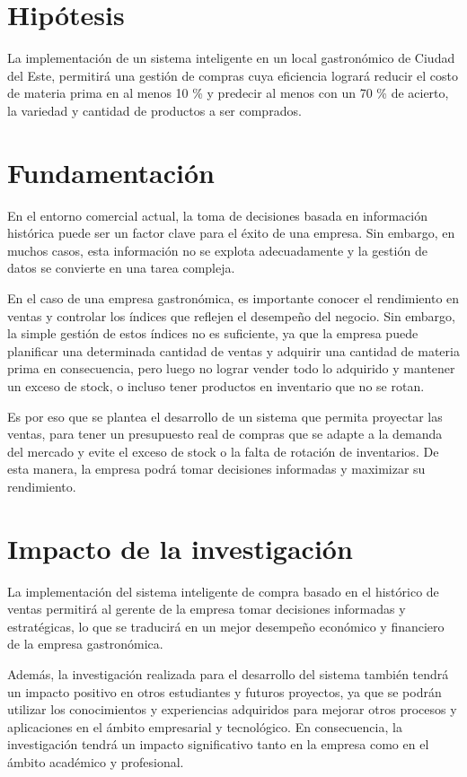 \section{Hipótesis}

La implementación de un sistema inteligente en un local gastronómico de Ciudad del Este, permitirá una gestión de compras cuya eficiencia logrará reducir el costo de materia prima en al menos 10 \% y predecir al menos con un 70 \% de acierto, la variedad y cantidad de productos a ser comprados.

\section{Fundamentación}

En el entorno comercial actual, la toma de decisiones basada en información histórica puede ser un factor clave para el éxito de una empresa. Sin embargo, en muchos casos, esta información no se explota adecuadamente y la gestión de datos se convierte en una tarea compleja.

En el caso de una empresa gastronómica, es importante conocer el rendimiento en ventas y controlar los índices que reflejen el desempeño del negocio. Sin embargo, la simple gestión de estos índices no es suficiente, ya que la empresa puede planificar una determinada cantidad de ventas y adquirir una cantidad de materia prima en consecuencia, pero luego no lograr vender todo lo adquirido y mantener un exceso de stock, o incluso tener productos en inventario que no se rotan.

Es por eso que se plantea el desarrollo de un sistema que permita proyectar las ventas, para tener un presupuesto real de compras que se adapte a la demanda del mercado y evite el exceso de stock o la falta de rotación de inventarios. De esta manera, la empresa podrá tomar decisiones informadas y maximizar su rendimiento.



\section{Impacto de la investigación}

La implementación del sistema inteligente de compra basado en el histórico de ventas permitirá al gerente de la empresa tomar decisiones informadas y estratégicas, lo que se traducirá en un mejor desempeño económico y financiero de la empresa gastronómica.

Además, la investigación realizada para el desarrollo del sistema también tendrá un impacto positivo en otros estudiantes y futuros proyectos, ya que se podrán utilizar los conocimientos y experiencias adquiridos para mejorar otros procesos y aplicaciones en el ámbito empresarial y tecnológico. En consecuencia, la investigación tendrá un impacto significativo tanto en la empresa como en el ámbito académico y profesional.






